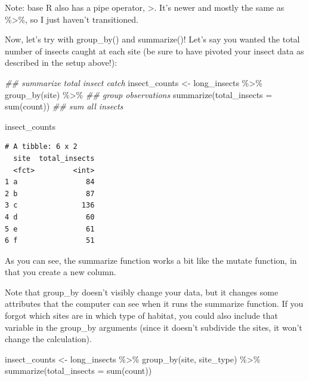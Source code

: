 \documentclass[
  letterpaper,
  DIV=11,
  numbers=noendperiod]{scrreprt}
\newenvironment{Shaded}{\begin{snugshade}}{\end{snugshade}}
\newcommand{\AttributeTok}[1]{\textcolor[rgb]{0.40,0.45,0.13}{#1}}
\newcommand{\DocumentationTok}[1]{\textcolor[rgb]{0.37,0.37,0.37}{\textit{#1}}}
\newcommand{\FunctionTok}[1]{\textcolor[rgb]{0.28,0.35,0.67}{#1}}
\newcommand{\NormalTok}[1]{\textcolor[rgb]{0.00,0.23,0.31}{#1}}
\newcommand{\OtherTok}[1]{\textcolor[rgb]{0.00,0.23,0.31}{#1}}
\newcommand{\SpecialCharTok}[1]{\textcolor[rgb]{0.37,0.37,0.37}{#1}}
\begin{document}
Note: base R also has a pipe operator, \textbar\textgreater. It's newer
and mostly the same as \%\textgreater\%, so I just haven't transitioned.

Now, let's try with group\_by() and summarize()! Let's say you wanted
the total number of insects caught at each site (be sure to have pivoted
your insect data as described in the setup above!):

\begin{Shaded}
\begin{Highlighting}[]
\DocumentationTok{\#\# summarize total insect catch}
\NormalTok{insect\_counts }\OtherTok{\textless{}{-}}\NormalTok{ long\_insects }\SpecialCharTok{\%\textgreater{}\%}
  \FunctionTok{group\_by}\NormalTok{(site) }\SpecialCharTok{\%\textgreater{}\%} \DocumentationTok{\#\# group observations}
  \FunctionTok{summarize}\NormalTok{(}\AttributeTok{total\_insects =} \FunctionTok{sum}\NormalTok{(count)) }\DocumentationTok{\#\# sum all insects}

\NormalTok{insect\_counts}
\end{Highlighting}
\end{Shaded}

\begin{verbatim}
# A tibble: 6 x 2
  site  total_insects
  <fct>         <int>
1 a                84
2 b                87
3 c               136
4 d                60
5 e                61
6 f                51
\end{verbatim}

As you can see, the summarize function works a bit like the mutate
function, in that you create a new column.

Note that group\_by doesn't visibly change your data, but it changes
some attributes that the computer can see when it runs the summarize
function. If you forgot which sites are in which type of habitat, you
could also include that variable in the group\_by arguments (since it
doesn't subdivide the sites, it won't change the calculation).

\begin{Shaded}
\begin{Highlighting}[]
\NormalTok{insect\_counts }\OtherTok{\textless{}{-}}\NormalTok{ long\_insects }\SpecialCharTok{\%\textgreater{}\%}
  \FunctionTok{group\_by}\NormalTok{(site, site\_type) }\SpecialCharTok{\%\textgreater{}\%}
  \FunctionTok{summarize}\NormalTok{(}\AttributeTok{total\_insects =} \FunctionTok{sum}\NormalTok{(count))}
\end{Highlighting}
\end{Shaded}
\end{document}
